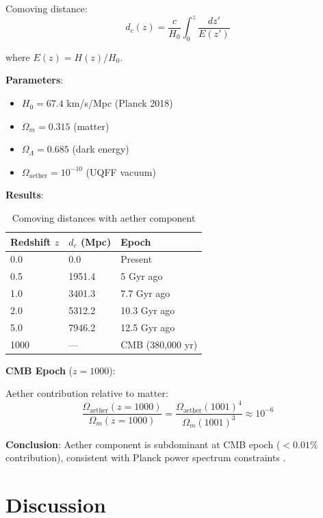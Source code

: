 \documentclass[12pt,a4paper]{article}
\begin{document}
Comoving distance:
\begin{equation}
d_c(z) = \frac{c}{H_0} \int_0^z \frac{dz'}{E(z')}
\label{eq:comoving_distance}
\end{equation}

where $E(z) = H(z)/H_0$.

\textbf{Parameters}:
\begin{itemize}
    \item $H_0 = 67.4$ km/s/Mpc (Planck 2018)
    \item $\Omega_m = 0.315$ (matter)
    \item $\Omega_\Lambda = 0.685$ (dark energy)
    \item $\Omega_{\text{aether}} = 10^{-10}$ (UQFF vacuum)
\end{itemize}

\textbf{Results}:

\begin{table}[H]
\centering
\begin{tabular}{@{}lll@{}}
\toprule
\textbf{Redshift $z$} & \textbf{$d_c$ (Mpc)} & \textbf{Epoch} \\
\midrule
0.0 & 0.0 & Present \\
0.5 & 1951.4 & 5 Gyr ago \\
1.0 & 3401.3 & 7.7 Gyr ago \\
2.0 & 5312.2 & 10.3 Gyr ago \\
5.0 & 7946.2 & 12.5 Gyr ago \\
1000 & --- & CMB (380,000 yr) \\
\bottomrule
\end{tabular}
\caption{Comoving distances with aether component}
\label{tab:cosmology}
\end{table}

\textbf{CMB Epoch} ($z = 1000$):

Aether contribution relative to matter:
\begin{equation}
\frac{\Omega_{\text{aether}}(z=1000)}{\Omega_m(z=1000)} = \frac{\Omega_{\text{aether}} (1001)^4}{\Omega_m (1001)^3} \approx 10^{-6}
\end{equation}

\textbf{Conclusion}: Aether component is subdominant at CMB epoch ($<0.01$\% contribution), consistent with Planck power spectrum constraints \cite{Planck2018}.

\section{Discussion}
\end{document}
